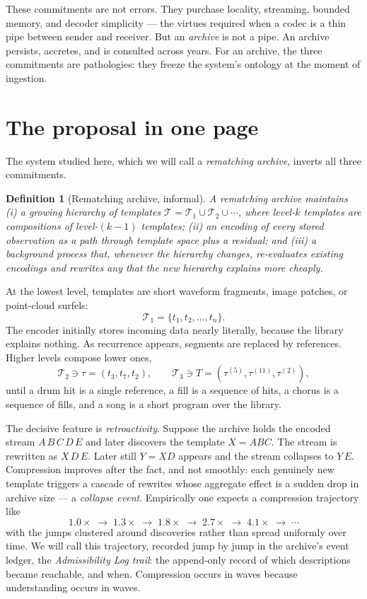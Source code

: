 \documentclass[11pt,oneside]{book}
\newtheorem{definition}[theorem]{Definition}
\theoremstyle{remark}
\newcommand{\Tem}{\mathcal{T}}
\begin{document}
These commitments are not errors. They purchase locality, streaming,
bounded memory, and decoder simplicity --- the virtues required when a
codec is a thin pipe between sender and receiver. But an \emph{archive}
is not a pipe. An archive persists, accretes, and is consulted across
years. For an archive, the three commitments are pathologies: they
freeze the system's ontology at the moment of ingestion.

\section{The proposal in one page}

The system studied here, which we will call a \emph{rematching archive},
inverts all three commitments.

\begin{definition}[Rematching archive, informal]
A rematching archive maintains (i) a growing hierarchy of templates
$\Tem = \Tem_1 \cup \Tem_2 \cup \cdots$, where level-$k$ templates are
compositions of level-$(k{-}1)$ templates; (ii) an encoding of every
stored observation as a path through template space plus a residual; and
(iii) a background process that, whenever the hierarchy changes,
re-evaluates existing encodings and rewrites any that the new hierarchy
explains more cheaply.
\end{definition}

At the lowest level, templates are short waveform fragments, image
patches, or point-cloud surfels:
\[
\Tem_1 = \{t_1, t_2, \dots, t_n\}.
\]
The encoder initially stores incoming data nearly literally, because the
library explains nothing. As recurrence appears, segments are replaced by
references. Higher levels compose lower ones,
\[
\Tem_2 \ni \tau = (t_3, t_7, t_2), \qquad
\Tem_3 \ni T = (\tau^{(5)}, \tau^{(11)}, \tau^{(2)}),
\]
until a drum hit is a single reference, a fill is a sequence of hits, a
chorus is a sequence of fills, and a song is a short program over the
library.

The decisive feature is \emph{retroactivity}. Suppose the archive holds
the encoded stream $A\,B\,C\,D\,E$ and later discovers the template
$X = ABC$. The stream is rewritten as $X\,D\,E$. Later still $Y = XD$
appears and the stream collapses to $Y\,E$. Compression improves after
the fact, and not smoothly: each genuinely new template triggers a
cascade of rewrites whose aggregate effect is a sudden drop in archive
size --- a \emph{collapse event}. Empirically one expects a compression
trajectory like
\[
1.0\times \;\to\; 1.3\times \;\to\; 1.8\times \;\to\; 2.7\times
\;\to\; 4.1\times \;\to\; \cdots
\]
with the jumps clustered around discoveries rather than spread uniformly
over time. We will call this trajectory, recorded jump by jump in the
archive's event ledger, the \emph{Admissibility Log trail}: the
append-only record of which descriptions became reachable, and when.
Compression occurs in waves because understanding occurs in waves.
\end{document}

